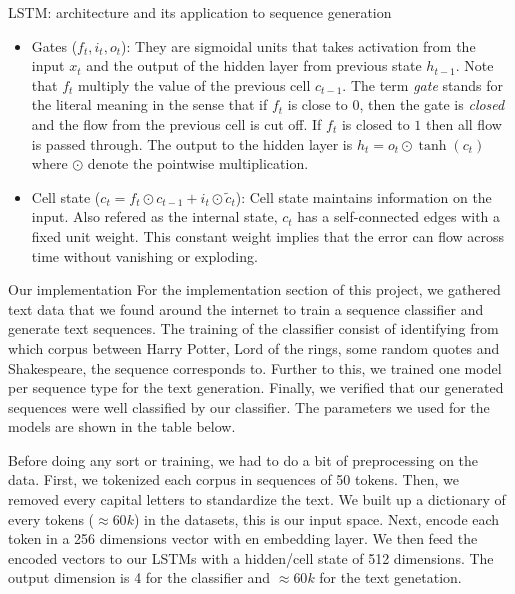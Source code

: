 \documentclass[final]{beamer}
\newlength{\colwidth}
\begin{document}
\begin{frame}[t]
\begin{columns}[t]
\begin{column}{\colwidth}
\begin{block}{LSTM: architecture and its application to sequence generation}
\begin{center}
    \begin{itemize}
    \item Gates ($f_t, i_t, o_t$): They are sigmoidal units that takes
      activation from the input $x_t$ and the output of the hidden layer from
      previous state $h_{t-1}$. Note that $f_t$ multiply the value of the
      previous cell $c_{t-1}$. The term \textit{gate} stands for the literal
      meaning in the sense that if $f_{t}$ is close to $0$, then the gate is
      \textit{closed} and the flow from the previous cell is cut off. If $f_t$
      is closed to $1$ then all flow is passed through. The output to the
      hidden layer is $h_t = o_t \odot \tanh(c_t)$ where $\odot$ denote the
      pointwise multiplication.
    \item Cell state ($c_t = f_t \odot c_{t-1} + i_t \odot \tilde{c}_t$): Cell
    state maintains information on the input. Also refered as the internal state,
    $c_t$ has a self-connected edges with a fixed unit weight. This constant
    weight implies that the error can flow across time without vanishing or
    exploding. 
\end{itemize}
\end{center}

\end{block}

\begin{block}{Our implementation}
For the implementation section of this project, we gathered text data that we
found around the internet to train a sequence classifier and generate text
sequences. The training of the classifier consist of identifying from which
corpus between Harry Potter, Lord of the rings, some random quotes and
Shakespeare, the sequence corresponds to. Further to this, we trained one model
per sequence type for the text generation. Finally, we verified that our
generated sequences were well classified by our classifier. The parameters we
used for the models are shown in the table below. 

Before doing any sort or training, we had to do a bit of preprocessing on the
data. First, we tokenized each corpus in sequences of 50 tokens. Then, we
removed every capital letters to standardize the text. We built up a dictionary
of every tokens ($\approx 60k$) in the datasets, this is our input space. Next,
encode each token in a 256 dimensions vector with en embedding layer. We then
feed the encoded vectors to our LSTMs with a hidden/cell state of 512
dimensions. The output dimension is 4 for the classifier and $\approx 60k$ for
the text genetation. 


\end{block}
\end{column}
\end{columns}
\end{frame}
\end{document}
